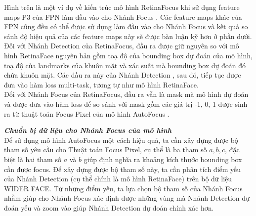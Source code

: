 {    \noindent
    Hình trên là một ví dụ về kiến trúc mô hình RetinaFocus khi sử dụng feature maps  P3 của FPN làm đầu vào cho Nhánh Focus .
    Các feature maps  khác của FPN cũng đều có thể được sử dụng làm đầu vào cho Nhánh Focus  và kết quả so sánh độ hiệu quả của các feature maps  này sẽ được bàn luận kỹ hơn ở phần dưới. \\
    Đối với Nhánh Detection  của RetinaFocus, đầu ra được giữ nguyên so với mô hình RetinaFace nguyên bản gồm toạ độ của bounding box  dự đoán của mô hình, toạ độ của landmarks của khuôn mặt và xác suất mà bounding box  dự đoán đó chứa khuôn mặt.
    Các đầu ra này của Nhánh Detection , sau đó, tiếp tục được đưa vào hàm loss multi-task, tương tự như mô hình RetinaFace. \\
    Đối với Nhánh Focus  của RetinaFocus, đầu ra vẫn là mask mà mô hình dự đoán và được đưa vào hàm loss để so sánh với mask gồm các giá trị -1, 0, 1 được sinh ra từ thuật toán Focus Pixel  của mô hình AutoFocus .

    \noindent
    \textbf{\textit{Chuẩn bị dữ liệu cho Nhánh Focus của mô hình}}  \\
    Để sử dụng mô hình AutoFocus  một cách hiệu quả, ta cần xây dựng được bộ tham số yêu cầu cho Thuật toán Focus Pixel, cụ thể là ba tham số $a, b, c$, đặc biệt là hai tham số $a$ và $b$ giúp định nghĩa ra khoảng kích thước bounding box  cần được focus.
    Để xây dựng được bộ tham số này, ta cần phân tích điểm yếu của Nhánh Detection  (cụ thể chính là mô hình RetinaFace) trên bộ dữ liệu WIDER FACE.
    Từ những điểm yếu, ta lựa chọn bộ tham số của Nhánh Focus  nhằm giúp cho Nhánh Focus  xác định được những vùng mà Nhánh Detection  dự đoán yếu và zoom vào giúp Nhánh Detection  dự đoán chính xác hơn.

}
